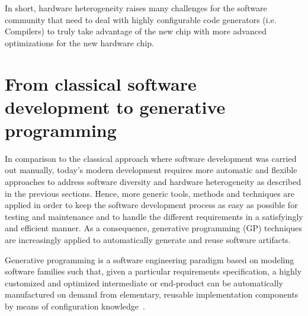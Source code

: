 
 








In short, hardware heterogeneity raises many challenges for the software community that need to deal with highly configurable code generators (i.e. Compilers) to truly take advantage of the new chip with more advanced optimizations for the new hardware chip.

\section{From classical software development to generative programming}
\label{sec:FROM} 
In comparison to the classical approach where software development was carried out manually, today’s modern development requires more automatic and flexible approaches to address software diversity and hardware heterogeneity as described in the previous sections.
Hence, more generic tools, methods and techniques are applied in order to keep the software development process as easy as possible for testing and maintenance and to handle the different requirements in a satisfyingly and efficient manner.
As a consequence, generative programming (GP) techniques are increasingly applied to automatically generate and reuse software artifacts.
\begin{mydef}
		Generative programming is a software engineering paradigm based on modeling software families such that, given a particular requirements specification, a highly customized and optimized intermediate or end-product can be automatically manufactured on demand from elementary, reusable implementation components by means of configuration knowledge~\cite{Czarnecki:2000:GPM:345203}.
\end{mydef}

